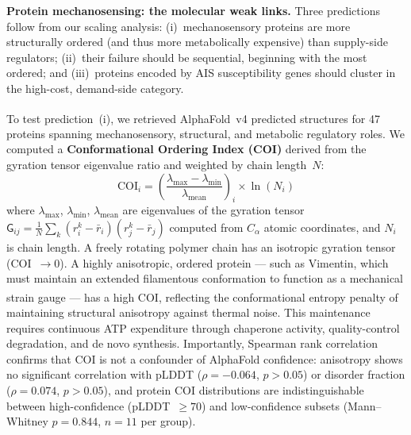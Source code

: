 \documentclass[12pt]{article}
\begin{document}
\textbf{Protein mechanosensing: the molecular weak links.} Three predictions follow from our scaling analysis: (i)~mechanosensory proteins are more structurally ordered (and thus more metabolically expensive) than supply-side regulators; (ii)~their failure should be sequential, beginning with the most ordered; and (iii)~proteins encoded by AIS susceptibility genes should cluster in the high-cost, demand-side category.

To test prediction~(i), we retrieved AlphaFold~v4 predicted structures\textsuperscript{\cite{jumper2021}} for 47 proteins spanning mechanosensory, structural, and metabolic regulatory roles. We computed a \textbf{Conformational Ordering Index (COI)} derived from the gyration tensor eigenvalue ratio and weighted by chain length~$N$:
\begin{equation}
\text{COI}_i = \left(\frac{\lambda_{\max} - \lambda_{\min}}{\lambda_{\text{mean}}}\right)_i \times \ln(N_i)
\end{equation}
where $\lambda_{\max}$, $\lambda_{\min}$, $\lambda_{\text{mean}}$ are eigenvalues of the gyration tensor $\mathsf{G}_{ij} = \frac{1}{N}\sum_k (r^k_i - \bar{r}_i)(r^k_j - \bar{r}_j)$ computed from $C_\alpha$ atomic coordinates, and $N_i$ is chain length. A freely rotating polymer chain has an isotropic gyration tensor (COI~$\to 0$). A highly anisotropic, ordered protein --- such as Vimentin, which must maintain an extended filamentous conformation to function as a mechanical strain gauge\textsuperscript{\cite{wuest2023}} --- has a high COI, reflecting the conformational entropy penalty of maintaining structural anisotropy against thermal noise. This maintenance requires continuous ATP expenditure through chaperone activity, quality-control degradation, and de novo synthesis. Importantly, Spearman rank correlation confirms that COI is not a confounder of AlphaFold confidence: anisotropy shows no significant correlation with pLDDT ($\rho = -0.064$, $p > 0.05$) or disorder fraction ($\rho = 0.074$, $p > 0.05$), and protein COI distributions are indistinguishable between high-confidence (pLDDT~$\geq 70$) and low-confidence subsets (Mann--Whitney $p = 0.844$, $n = 11$ per group).
\end{document}
